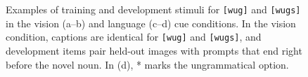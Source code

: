 \begin{figure}[t]
    \caption{Examples of training and development stimuli for \texttt{[wug]} and \texttt{[wugs]} in the vision (a--b) and language (c--d) cue conditions. In the vision condition, captions are identical for \texttt{[wug]} and \texttt{[wugs]}, and development items pair held-out images with prompts that end right before the novel noun. In (d), * marks the ungrammatical option.}
    \label{fig:stimuli}
\end{figure}
